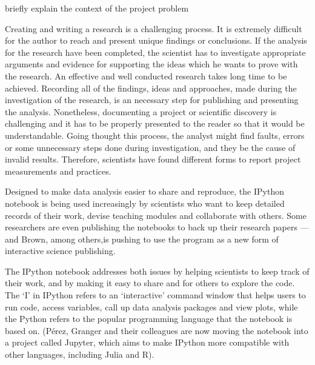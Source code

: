 briefly explain the context of the project problem

Creating and writing a research is a challenging process. It is extremely difficult for the author to reach and present unique findings or conclusions. If the analysis for the research have been completed, the scientist has to investigate appropriate arguments and evidence for supporting the ideas which he wants to prove with the research. An effective and well conducted research takes long time to be achieved. Recording all of the findings, ideas and approaches, made during the investigation of the research, is an necessary step for publishing and presenting the analysis. Nonetheless, documenting a project or scientific discovery is challenging and it has to be properly presented to the reader so that it would be understandable. Going thought this process, the analyst might find faults, errors or some unnecessary steps done during investigation, and they be the cause of invalid results. Therefore, scientists have found different forms to report project measurements and practices.

\cite{holmes2003reworking}

Designed to make data analysis easier to share and reproduce, the IPython notebook is being used increasingly by scientists who want to keep detailed records of their work, devise teaching modules and collaborate with others. Some researchers are even publishing the notebooks to back up their research papers — and Brown, among others,is pushing to use the program as a new form of interactive science publishing. \cite{shen2014interactive}

The IPython notebook addresses both issues
by helping scientists to keep track of their work,
and by making it easy to share and for others
to explore the code. The ‘I’ in IPython refers to
an ‘interactive’ command window that helps
users to run code, access variables, call up data
analysis packages and view plots, while the
Python refers to the popular programming
language that the notebook is based on. (Pérez,
Granger and their colleagues are now moving
the notebook into a project called Jupyter, which
aims to make IPython more compatible with
other languages, including Julia and R).

